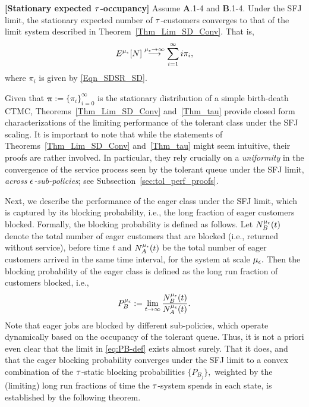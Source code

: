 \begin{thm} {\bf [Stationary expected ${\tau}$-occupancy]}
\label{Thm_tau}
Assume $\bm{A}$.1-4 and $\bm{B}$.1-4. Under the SFJ limit, the
stationary expected number of ${\tau}$-customers converges to that of the
limit system described in Theorem~\ref{Thm_Lim_SD_Conv}. That is,
\begin{eqnarray*}
\label{Eqn_SDSR_Expected_Number}
   E^{\mu_\epsilon}[N] \stackrel{{\mu_\epsilon} \to \infty}{\longrightarrow}  \sum_{i=1}^\infty i \pi_{i},
\end{eqnarray*}
where ${\pi}_i$ is given by \eqref{Eqn_SDSR_SD}.
\end{thm}

Given that ${\bm \pi} := \{\pi_{i} \}_{i = 0}^{\infty}$ is the
stationary distribution of a simple birth-death CTMC,
Theorems~\ref{Thm_Lim_SD_Conv} and~\ref{Thm_tau} provide closed form
characterizations of the limiting performance of the tolerant class
under the SFJ scaling. It is important to note that while the
statements of Theorems~\ref{Thm_Lim_SD_Conv} and~\ref{Thm_tau} might
seem intuitive, their proofs are rather involved. In particular, they
rely crucially on a \emph{uniformity} in the convergence of the
service process seen by the tolerant queue under the SFJ limit,
\emph{across ${ \epsilon }$-sub-policies}; see
Subsection~\ref{sec:tol_perf_proofs}.


Next, we describe the performance of the eager class under the SFJ
limit, which is captured by its blocking probability, i.e., the long
fraction of eager customers blocked. Formally, the blocking
probability is defined as follows. Let $N_B^{\mu_\epsilon} (t)$ denote the total
number of eager customers that are blocked (i.e., returned without
service), before time $t$ and $N_A^{\mu_\epsilon} (t)$ be the total number of
eager customers arrived in the same time interval, for the system at
scale $\mu_{ \epsilon }.$
Then the blocking probability of the eager class is defined as the
long run fraction of customers blocked, i.e.,
\begin{equation}
  \label{eq:PB-def}
P_B^{\mu_\epsilon} := \lim\limits_{t \to \infty } \frac{N_B^{\mu_\epsilon} (t)}{N_A^{\mu_\epsilon} (t)}.
\end{equation}
Note that eager jobs are blocked by different sub-policies, which
operate dynamically based on the occupancy of the tolerant
queue. Thus, it is not a priori even clear that the limit in
\eqref{eq:PB-def} exists almost surely. That it does, and that the
eager blocking probability converges under the SFJ limit to a convex
combination of the ${\tau}$-static blocking probabilities $\{ P_{B_j}\},$
weighted by the (limiting) long run fractions of time the ${\tau}$-system
spends in each state, is established by the following theorem.

